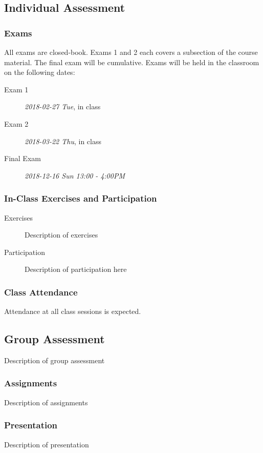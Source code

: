 \documentclass[article,letterpaper,times,10pt,listings-bw,microtype]{scrartcl}
\begin{document}
\subsection*{Individual Assessment}
\label{sec:orgfd25c99}
\subsubsection*{Exams}
\label{sec:org96860af}
All exams are closed-book. Exams 1 and 2 each covers a subsection of the
course material. The final exam will be cumulative. Exams will be held in the
classroom on the following dates:

\begin{description}
\item[{Exam 1}] \textit{2018-02-27 Tue}, in class
\item[{Exam 2}] \textit{2018-03-22 Thu}, in class
\item[{Final Exam}] \textit{2018-12-16 Sun 13:00 } \emph{- 4:00PM}
\end{description}
\subsubsection*{In-Class Exercises and Participation}
\label{sec:org44289c1}
\begin{description}
\item[{Exercises}] Description of exercises

\item[{Participation}] Description of participation here
\end{description}
\subsubsection*{Class Attendance}
\label{sec:orga8e4118}
Attendance at all class sessions is expected.
\subsection*{Group Assessment}
\label{sec:orgce26979}
Description of group assessment
\subsubsection*{Assignments}
\label{sec:org19c84cc}
Description of assignments
\subsubsection*{Presentation}
\label{sec:org622d00f}
Description of presentation
\end{document}
